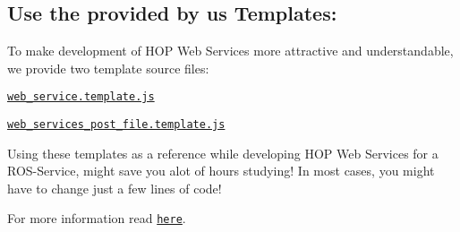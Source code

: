 \subsection*{Use the provided by us Templates\-:}

To make development of H\-O\-P Web Services more attractive and understandable, we provide two template source files\-:


\begin{DoxyItemize}
\item \href{https://github.com/rapp-project/rapp-platform/tree/master/rapp_web_services/services/templates/web_service.template.js}{\tt web\-\_\-service.\-template.\-js}
\item \href{https://github.com/rapp-project/rapp-platform/blob/master/rapp_web_services/services/templates/web_service_post_file.template.js}{\tt web\-\_\-services\-\_\-post\-\_\-file.\-template.\-js}
\end{DoxyItemize}

Using these templates as a reference while developing H\-O\-P Web Services for a R\-O\-S-\/\-Service, might save you alot of hours studying! In most cases, you might have to change just a few lines of code!

For more information read \href{https://github.com/rapp-project/rapp-platform/tree/master/rapp_web_services/services/templates}{\tt here}. 